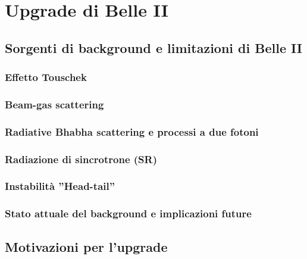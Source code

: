 \documentclass[10pt,a4paper,twoside]{report}
\begin{document}
\chapter{Upgrade di Belle II}

\section{Sorgenti di background e limitazioni di Belle II}

\subsection{Effetto Touschek}

\subsection{Beam-gas scattering}

\subsection{Radiative Bhabha scattering e processi a due fotoni}

\subsection{Radiazione di sincrotrone (SR)}

\subsection{Instabilità ''Head-tail''}

\subsection{Stato attuale del background e implicazioni future}


\section{Motivazioni per l'upgrade}
\end{document}
